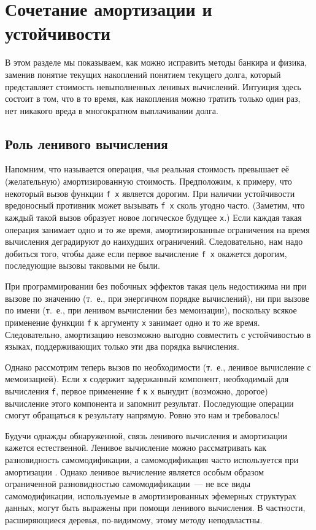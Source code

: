 \section{Сочетание амортизации и устойчивости}
\label{sc:6.2}

В этом разделе мы показываем, как можно исправить методы банкира и
физика, заменив понятие текущих накоплений понятием текущего долга,
который представляет стоимость невыполненных ленивых
вычислений. Интуиция здесь состоит в том, что в то время, как
накопления можно тратить только один раз, нет никакого вреда в
многократном выплачивании долга.

\subsection{Роль ленивого вычисления}
\label{sc:6.2.1}

Напомним, что  называется операция, чья
реальная стоимость превышает её (желательную) амортизированную
стоимость. Предположим, к примеру, что некоторый вызов функции
\lstinline!f x!
является дорогим. При наличии устойчивости вредоносный противник может
вызывать \lstinline!f x! сколь угодно часто. (Заметим, что каждый
такой вызов образует новое логическое будущее \lstinline!x!.) Если
каждая такая операция занимает одно и то же время, амортизированные
ограничения на время вычисления деградируют до наихудших
ограничений. Следовательно, нам надо добиться того, чтобы даже если
первое вычисление \lstinline!f x! окажется дорогим, последующие вызовы
таковыми не были.

При программировании без побочных эффектов такая цель недостижима ни
при вызове по значению (т.~е., при энергичном порядке вычислений),
ни при вызове по имени (т.~е., при ленивом вычислении без мемоизации),
поскольку всякое применение функции \lstinline!f! к аргументу
\lstinline!x! занимает одно и то же время. Следовательно, амортизацию
невозможно выгодно совместить с устойчивостью в языках, поддерживающих
только эти два порядка вычисления.

Однако рассмотрим теперь вызов по необходимости (т.~е., ленивое
вычисление с мемоизацией). Если \lstinline!x! содержит задержанный
компонент, необходимый для вычисления \lstinline!f!, первое применение
\lstinline!f! к \lstinline!x! вынудит (возможно, дорогое) вычисление
этого компонента и запомнит результат. Последующие операции смогут
обращаться к результату напрямую. Ровно это нам и требовалось!

\begin{remark}
  Будучи однажды обнаруженной, связь ленивого вычисления и амортизации
  кажется естественной. Ленивое вычисление можно рассматривать как
  разновидность самомодификации, а самомодификация часто используется
  при амортизации \cite{SleatorTarjan1985, SleatorTarjan1986b}. Однако
  ленивое вычисление является особым образом ограниченной
  разновидностью самомодификации~--- не все виды самомодификации,
  используемые в амортизированных эфемерных структурах данных, могут
  быть выражены при помощи ленивого вычисления. В частности,
  расширяющиеся деревья, по-видимому, этому методу неподвластны.
\end{remark}
